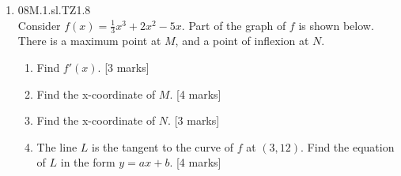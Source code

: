 \documentclass[12pt, twoside]{article}
\begin{document}
\begin{enumerate}
    \item 08M.1.sl.TZ1.8\\
    Consider $f(x)= \frac{1}{3} x^3+2x^2-5x$. Part of the graph of $f$ is shown below. There is a maximum point at $M$, and a point of inflexion at $N$.
      \begin{center}
      \end{center}
      \begin{enumerate}
        \item Find $f'(x)$. [3 marks]
        \item Find the x-coordinate of $M$. [4 marks]
        \item Find the x-coordinate of $N$. [3 marks]
        \item The line $L$ is the tangent to the curve of $f$ at $(3,12)$. Find the equation of $L$ in the form $y=ax+b$. [4 marks]
      \end{enumerate}


\end{enumerate}
\end{document}
